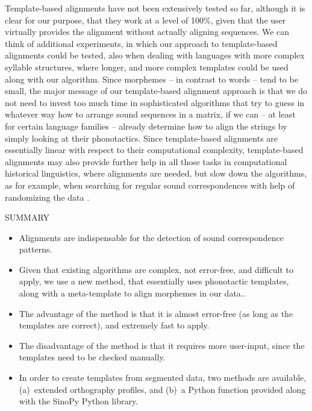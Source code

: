 \documentclass[xetex,svgnames]{scrartcl}
\begin{document}
Template-based alignments have not been extensively tested so far, although it is clear for our
purpose, that they work at a level of 100\%, given that the user virtually provides the alignment
without actually aligning sequences. We can think of additional experiments, in which our approach
to template-based alignments could be tested, also when dealing with languages with more complex
syllable structures, where longer, and more complex templates could be used along with our
algorithm. Since morphemes -- in contrast to words -- tend to be small, the major message
of our template-based alignment approach is that we do not need to invest too much time in
sophisticated algorithms that try to guess in whatever way how to arrange sound sequences in a
matrix, if we can -- at least for certain language families -- already determine how to align the
strings by simply looking at their phonotactics. Since template-based alignments are essentially
linear with respect to their computational complexity, template-based alignments may also provide
further help in all those tasks in computational historical linguistics, where alignments are
needed, but slow down the algorithms, as for example, when searching for regular sound
correspondences with help of randomizing the data \citep{List2012b}.

\begin{center}
  \hline
  SUMMARY \\\hline
  \begin{itemize}
    \item Alignments are indispensable for the detection of sound correspondence patterns.
    \item Given that existing algorithms are complex, not error-free, and difficult to apply, we use
      a new method, that essentially uses phonotactic templates, along with a meta-template to align
      morphemes in our data..
    \item The advantage of the method is that it is almost error-free (as long as the templates are
      correct), and extremely fast to apply.
    \item The disadvantage of the method is that it requires more user-input, since the templates
      need to be checked manually.
    \item In order to create templates from segmented data, two methods are available, (a)~extended
      orthography profiles, and (b)~a Python function provided along with the SinoPy Python library.
  \end{itemize}\\\hline
  \endtabular
\end{center}
\end{document}
